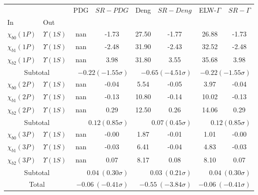\begin{tabular}{|l|l|c|c|c|c|c|c|}%
\hline%
&&PDG&$SR-PDG$&Deng&$SR-Deng$&ELW-$\Gamma$&$SR-\Gamma$\\%
In&Out&&&&&&\\%
\hline%
$\chi_{b0}(1P)$&$\Upsilon(1S)$&nan&-1.73&27.50&-1.77&26.88&-1.73\\%
$\chi_{b1}(1P)$&$\Upsilon(1S)$&nan&-2.48&31.90&-2.43&32.52&-2.48\\%
$\chi_{b2}(1P)$&$\Upsilon(1S)$&nan&3.98&31.80&3.55&35.68&3.98\\%
\hline%
\hline%
\multicolumn{2}{|c|}{Subtotal}&\multicolumn{2}{|r|}{$-0.22 (-1.55\sigma)$}&\multicolumn{2}{|r|}{$-0.65 (-4.51\sigma)$}&\multicolumn{2}{|r|}{$-0.22 (-1.55\sigma)$}\\%
\hline%
\hline%
$\chi_{b0}(2P)$&$\Upsilon(1S)$&nan&-0.04&5.54&-0.05&3.97&-0.04\\%
$\chi_{b1}(2P)$&$\Upsilon(1S)$&nan&-0.13&10.80&-0.14&10.02&-0.13\\%
$\chi_{b2}(2P)$&$\Upsilon(1S)$&nan&0.29&12.50&0.26&14.06&0.29\\%
\hline%
\hline%
\multicolumn{2}{|c|}{Subtotal}&\multicolumn{2}{|r|}{$0.12 (0.85\sigma)$}&\multicolumn{2}{|r|}{$0.07 (0.45\sigma)$}&\multicolumn{2}{|r|}{$0.12 (0.85\sigma)$}\\%
\hline%
\hline%
$\chi_{b0}(3P)$&$\Upsilon(1S)$&nan&-0.00&1.87&-0.01&1.01&-0.00\\%
$\chi_{b1}(3P)$&$\Upsilon(1S)$&nan&-0.03&6.41&-0.04&4.83&-0.03\\%
$\chi_{b2}(3P)$&$\Upsilon(1S)$&nan&0.07&8.17&0.08&8.10&0.07\\%
\hline%
\hline%
\multicolumn{2}{|c|}{Subtotal}&\multicolumn{2}{|r|}{$0.04~(0.30\sigma)$}&\multicolumn{2}{|r|}{$0.03~(0.21\sigma)$}&\multicolumn{2}{|r|}{$0.04~(0.30\sigma)$}\\%
\hline%
\hline%
\multicolumn{2}{|c|}{Total}&\multicolumn{2}{|r|}{$-0.06~(-0.41\sigma)$}&\multicolumn{2}{|r|}{$-0.55~(-3.84\sigma)$}&\multicolumn{2}{|r|}{$-0.06~(-0.41\sigma)$}\\%
\hline%
\end{tabular}